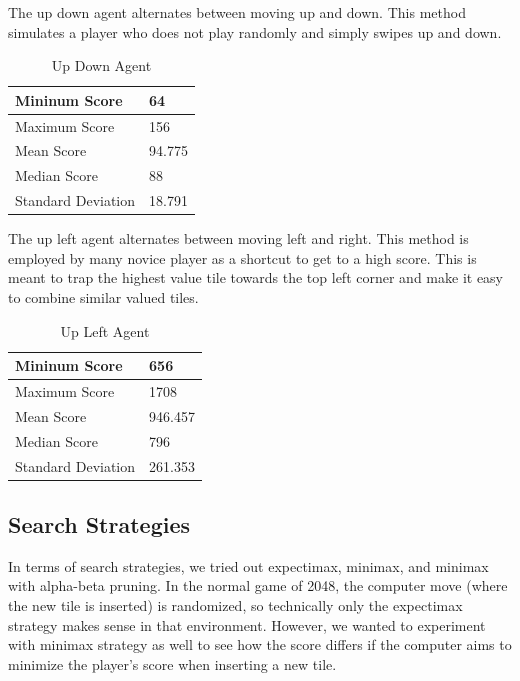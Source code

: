 \documentclass[9pt,twocolumn]{article}
\begin{document}
The up down agent alternates between moving up and down. This method simulates a player who does not play randomly and simply swipes up and down.

\begin{table}[!htbp]

\centering

\begin{tabular}{|l|l|}
\hline
Mininum Score      & 64 \\ \hline
Maximum Score      & 156 \\ \hline
Mean Score         & 94.775 \\ \hline
Median Score       & 88 \\ \hline
Standard Deviation & 18.791 \\ \hline
\end{tabular}

\caption{Up Down Agent}

\end{table}

The up left agent alternates between moving left and right. This method is employed by many novice player as a shortcut to get to a high score. This is meant to trap the highest value tile towards the top left corner and make it easy to combine similar valued tiles.

\begin{table}[!htbp]

\centering

\begin{tabular}{|l|l|}
\hline
Mininum Score      & 656 \\ \hline
Maximum Score      & 1708 \\ \hline
Mean Score         & 946.457 \\ \hline
Median Score       & 796 \\ \hline
Standard Deviation & 261.353 \\ \hline
\end{tabular}

\caption{Up Left Agent}

\end{table}

\subsection{Search Strategies}

In terms of search strategies, we tried out expectimax, minimax, and minimax with alpha-beta pruning. In the normal game of 2048, the computer move (where the new tile is inserted) is randomized, so technically only the expectimax strategy makes sense in that environment. However, we wanted to experiment with minimax strategy as well to see how the score differs if the computer aims to minimize the player’s score when inserting a new tile.
\end{document}
